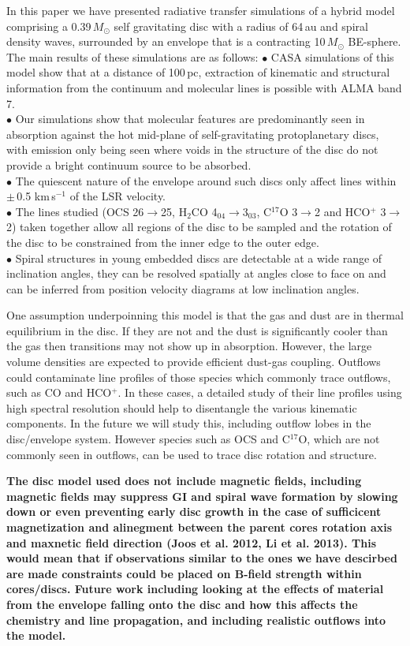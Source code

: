 \documentclass[useAMS,usenatbib]{mn2e}
\begin{document}
In this paper we have presented radiative transfer simulations of a hybrid model comprising a 0.39$\, M_\odot$ self gravitating disc with a radius of 64$\,$au and spiral density waves, surrounded by an envelope that is a contracting 10$\,M_\odot$ BE-sphere. The main results of these simulations are as follows:\newline
$\bullet$ CASA simulations of this model show that at a distance of 100$\,$pc, extraction of kinematic and structural information from the continuum and molecular lines is possible with ALMA band 7.\\
$\bullet$ Our simulations show that molecular features are predominantly seen in absorption against the hot mid-plane of self-gravitating protoplanetary discs, with emission only being seen where voids in the structure of the disc do not provide a bright continuum source to be absorbed.\\
$\bullet$ The quiescent nature of the envelope around such discs only affect lines within $\pm\,$0.5 km$\,$s$^{-1}$ of the LSR velocity.\\
$\bullet$ The lines studied (OCS 26$\rightarrow$25, H$_2$CO 4$_{04}$$\rightarrow$3$_{03}$, C$^{17}$O 3$\rightarrow$2 and HCO$^+$ 3$\rightarrow$2) taken together allow all regions of the disc to be sampled and the rotation of the disc to be constrained from the inner edge to the outer edge.\\
$\bullet$ Spiral structures in young embedded discs are detectable at a wide range of inclination angles, they can be resolved spatially at angles close to face on and can be inferred from position velocity diagrams at low inclination angles.\smallskip


One assumption underpoinning this model is that the gas and dust are in thermal equilibrium in the disc. If they are not and the dust is significantly cooler than the gas then transitions may not show up in absorption. However, the large volume densities are expected to provide efficient dust-gas coupling. Outflows could contaminate line profiles of  those species  which commonly trace outflows, such as CO and HCO$^+$. In these cases, a detailed study of their line profiles using high spectral resolution should help to disentangle the various kinematic components.  In the future we will study this, including outflow lobes in the disc/envelope system.  However species such as OCS and C$^{17}$O, which are not commonly seen in outflows, can be used to trace disc rotation and structure.\smallskip


{\bf The disc model used does not include magnetic fields, including magnetic fields may suppress GI and spiral wave formation by slowing down or even preventing early disc growth in the case of sufficicent magnetization and alinegment between the parent cores rotation axis and maxnetic field direction (Joos et al. 2012, Li et al. 2013). This would mean that if observations similar to the ones we have descirbed are made constraints could be placed on B-field strength within cores/discs. \smallskip Future work including looking at the effects of material from the envelope falling onto the disc and how this affects the chemistry and line propagation, and including realistic outflows into the model.}
\end{document}
